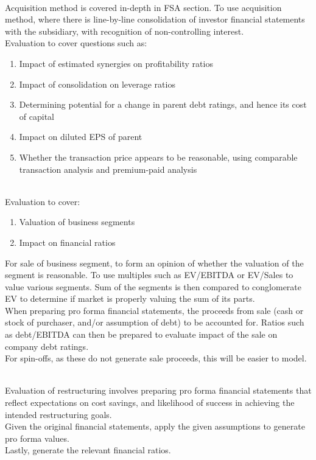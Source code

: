 \begin{remark} \\
Acquisition method is covered in-depth in FSA section. To use acquisition method, where there is line-by-line consolidation of investor financial statements with the subsidiary, with recognition of non-controlling interest.\\
Evaluation to cover questions such as:
\begin{enumerate}[label=\roman*.]
\setlength{\itemsep}{0pt}
\item Impact of estimated synergies on profitability ratios
\item Impact of consolidation on leverage ratios
\item Determining potential for a change in parent debt ratings, and hence its cost of capital
\item Impact on diluted EPS of parent
\item Whether the transaction price appears to be reasonable, using comparable transaction analysis and premium-paid analysis
\end{enumerate}
\end{remark}

\begin{remark} \\
Evaluation to cover:
\begin{enumerate}[label=\roman*.]
\setlength{\itemsep}{0pt}
\item Valuation of business segments
\item Impact on financial ratios
\end{enumerate}
For sale of business segment, to form an opinion of whether the valuation of the segment is reasonable. To use multiples such as EV/EBITDA or EV/Sales to value various segments. Sum of the segments is then compared to conglomerate EV to determine if market is properly valuing the sum of its parts.\\
When preparing pro forma financial statements, the proceeds from sale (cash or stock of purchaser, and/or assumption of debt) to be accounted for. Ratios such as debt/EBITDA can then be prepared to evaluate impact of the sale on company debt ratings.\\
For spin-offs, as these do not generate sale proceeds, this will be easier to model.
\end{remark}

\begin{remark} \\
Evaluation of restructuring involves preparing pro forma financial statements that reflect expectations on cost savings, and likelihood of success in achieving the intended restructuring goals.\\
Given the original financial statements, apply the given assumptions to generate pro forma values.\\
Lastly, generate the relevant financial ratios.
\end{remark}
